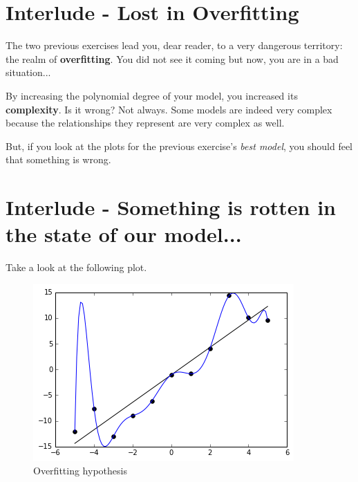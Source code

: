 
\section*{Interlude - Lost in Overfitting}

The two previous exercises lead you, dear reader, to a very dangerous territory: the realm of \textbf{overfitting}.  You did not see it coming but now, you are in a bad situation...

By increasing the polynomial degree of your model, you increased its \textbf{complexity}.  
Is it wrong?
Not always.
Some models are indeed very complex because the relationships they represent are very complex as well.

But, if you look at the plots for the previous exercise's \textit{best model}, you should feel that something is wrong.

\section*{Interlude - Something is rotten in the state of our model...}
Take a look at the following plot. 

\begin{figure}[!h]
    \centering
    \includegraphics[scale=0.6]{assets/overfitt.png}
    \caption{Overfitting hypothesis}
\end{figure}

